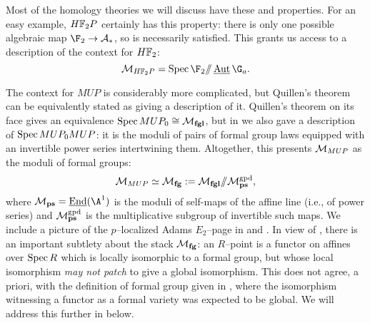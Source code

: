 \begin{example}
Most of the homology theories we will discuss have these {\CH} and {\FH} properties.  For an easy example, $\HFtwo P$ certainly has this property: there is only one possible algebraic map $\F_2 \to \mathcal A_*$, so {\FH} is necessarily satisfied.  This grants us access to a description of the context for $\HFtwo$: \[\context{\HFtwo P} = \Spec \F_2 \mmod \InternalAut{\G_a}.\]
\end{example}

\begin{example}\label{ContextOfMUPExample}
The context for $MUP$ is considerably more complicated, but Quillen's theorem can be equivalently stated as giving a description of it.  Quillen's theorem on its face gives an equivalence $\operatorname{Spec} MUP_0 \cong \mathcal{M}_{\mathbf{fgl}}$, but in  we also gave a description of $\operatorname{Spec} MUP_0 MUP$: it is the moduli of pairs of formal group laws equipped with an invertible power series intertwining them.  Altogether, this presents $\mathcal{M}_{MUP}$ as the moduli of formal groups: \[\mathcal{M}_{MUP} \simeq \mathcal{M}_{\mathbf{fg}} := \mathcal{M}_{\mathbf{fgl}} /\!\!/ \mathcal{M}_{\mathbf{ps}}^{\mathrm{gpd}},\] where $\moduli{ps} = \InternalEnd(\A^1)$ is the moduli of self-maps of the affine line (i.e., of power series) and $\mathcal{M}_{\mathbf{ps}}^{\mathrm{gpd}}$ is the multiplicative subgroup of invertible such maps.  We include a picture of the $p$--localized Adams $E_2$--page in  and .  In view of , there is an important subtlety about the stack $\mathcal{M}_{\mathbf{fg}}$: an $R$--point is a functor on affines over $\operatorname{Spec} R$ which is locally isomorphic to a formal group, but whose local isomorphism \emph{may not patch} to give a global isomorphism.  This does not agree, a priori, with the definition of formal group given in , where the isomorphism witnessing a functor as a formal variety was expected to be global.  We will address this further in  below.
\end{example}


